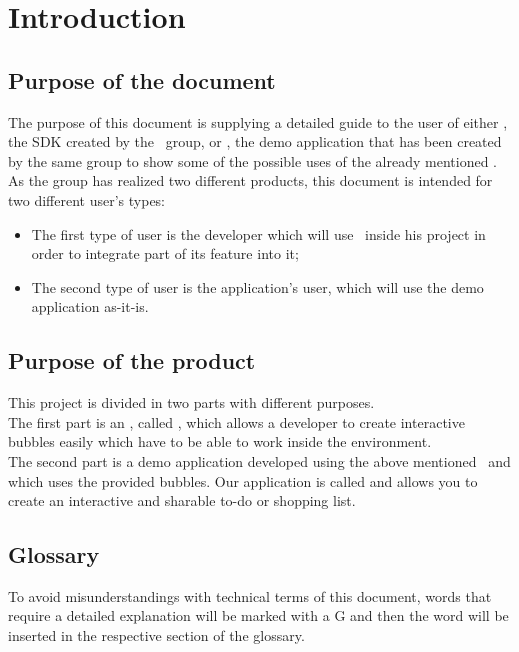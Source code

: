 \section{Introduction}

\subsection{Purpose of the document}
The purpose of this document is supplying a detailed guide to the user of either \progettoShort, the SDK created by the \gruppo\ group, or \app, the demo application that has been created by the same group to show some of the possible uses of the already mentioned . \\
As the group has realized two different products, this document is intended for two different user's types:
\begin{itemize}
	\item The first type of user is the developer which will use \progettoShort\ inside his  project in order to integrate part of its feature into it;
	\item The second type of user is the application's user, which will use the demo application as-it-is.
\end{itemize}

\subsection{Purpose of the product}
This project is divided in two parts with different purposes. \\
The first part is an , called \progettoShort, which allows a developer to create interactive bubbles easily which have to be able to work inside the  environment. \\
The second part is a demo application developed using the above mentioned \progettoShort\ and which uses the provided bubbles. Our application is called \app and allows you to create an interactive and sharable to-do or shopping list.

\subsection{Glossary}
To avoid misunderstandings with technical terms of this document, words that require a detailed explanation will be marked with a G and then the word will be inserted in the respective section of the glossary.

\newpage